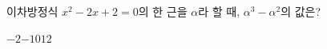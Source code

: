 이차방정식 $x^2-2x+2=0$의 한 근을 $\alpha$라 할 때, $\alpha^3-\alpha^2$의 값은?
\begin{choices32}{$-2$}{$-1$}{$0$}{$1$}{$2$}\end{choices32}
